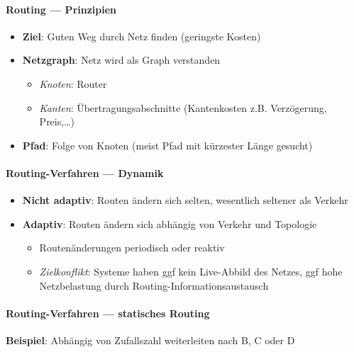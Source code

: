 \paragraph{Routing --- Prinzipien}
\begin{itemize}
  \item \textbf{Ziel}: Guten Weg durch Netz finden (geringste Kosten)
  \item \textbf{Netzgraph}: Netz wird als Graph verstanden
  \begin{itemize}
    \item \emph{Knoten}: Router
    \item \emph{Kanten}: Übertragungsabschnitte (Kantenkosten z.B. Verzögerung, Preis,\dots)
  \end{itemize}
  \item \textbf{Pfad}: Folge von Knoten (meist Pfad mit kürzester Länge gesucht)
\end{itemize}

\paragraph{Routing-Verfahren --- Dynamik}
\begin{itemize}
  \item \textbf{Nicht adaptiv}: Routen ändern sich selten, wesentlich seltener als Verkehr
  \item \textbf{Adaptiv}: Routen ändern sich abhängig von Verkehr und Topologie
  \begin{itemize}
    \item Routenänderungen periodisch oder reaktiv
    \item \emph{Zielkonflikt}: Systeme haben ggf kein Live-Abbild des Netzes, ggf hohe Netzbelastung durch Routing-Informationsaustausch
  \end{itemize}
\end{itemize}

\paragraph{Routing-Verfahren --- statisches Routing}
\textbf{Beispiel}: Abhängig von Zufallszahl weiterleiten nach B, C oder D


